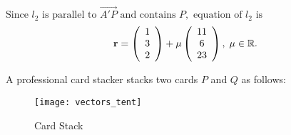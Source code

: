 \documentclass[12pt, a4 paper]{article}
\begin{document}
\begin{outline}[enumerate]
					${\textrm{Since }}{l_2}{\textrm{ is parallel to }}\overrightarrow {A'P} {\textrm{ and contains }}P,{\textrm{ equation of }}{l_2}{\textrm{ is}}$
					\begin{align*}
						{\bf{r}} = \left( {\begin{array}{*{20}{c}}1 \\3\\2\end{array}} \right) + \mu \left( {\begin{array}{*{20}{c}}{11}\\6\\{23}\end{array}} \right),\;\mu  \in \mathbb{R}.
					\end{align*}


					\color{black}
					\newpage
					\1 A professional card stacker stacks two cards $P$ and $Q$ as follows:
					\begin{figure}[h]
						\centering
						\texttt{[image: vectors\_tent]}
						\caption{Card Stack}
					\end{figure}


\end{outline}
\end{document}
